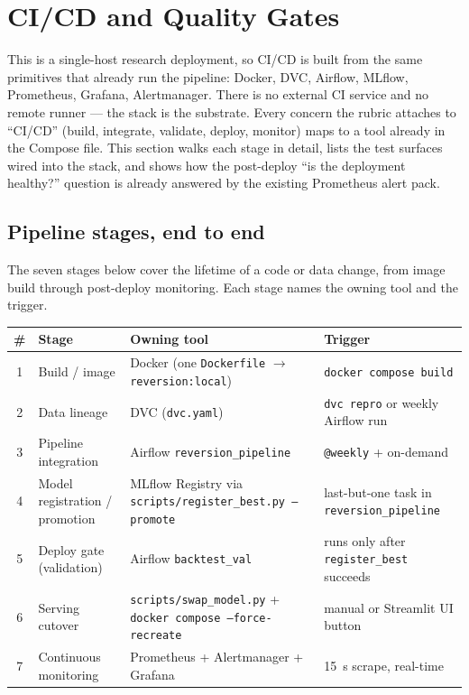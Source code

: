 \documentclass[11pt,a4paper]{article}
\begin{document}
\newpage
\section{CI/CD and Quality Gates}\label{sec:cicd}

This is a single-host research deployment, so CI/CD is built from the same primitives that already run the pipeline: Docker, DVC, Airflow, MLflow, Prometheus, Grafana, Alertmanager. There is no external CI service and no remote runner --- the stack is the substrate. Every concern the rubric attaches to ``CI/CD'' (build, integrate, validate, deploy, monitor) maps to a tool already in the Compose file. This section walks each stage in detail, lists the test surfaces wired into the stack, and shows how the post-deploy ``is the deployment healthy?'' question is already answered by the existing Prometheus alert pack.


\subsection{Pipeline stages, end to end}\label{sec:cicd-stages}

The seven stages below cover the lifetime of a code or data change, from image build through post-deploy monitoring. Each stage names the owning tool and the trigger.

\begin{tabularx}{\linewidth}{@{}clXl@{}}
\toprule
\textbf{\#} & \textbf{Stage} & \textbf{Owning tool} & \textbf{Trigger} \\
\midrule
1 & Build / image                          & Docker (one \texttt{Dockerfile} $\to$ \texttt{reversion:local})              & \texttt{docker compose build} \\
2 & Data lineage                           & DVC (\texttt{dvc.yaml})                                                       & \texttt{dvc repro} or weekly Airflow run \\
3 & Pipeline integration                   & Airflow \texttt{reversion\_pipeline}                                          & \texttt{@weekly} + on-demand \\
4 & Model registration / promotion         & MLflow Registry via \texttt{scripts/register\_best.py --promote}              & last-but-one task in \texttt{reversion\_pipeline} \\
5 & Deploy gate (validation)               & Airflow \texttt{backtest\_val}                                                & runs only after \texttt{register\_best} succeeds \\
6 & Serving cutover                        & \texttt{scripts/swap\_model.py} + \texttt{docker compose --force-recreate}    & manual or Streamlit UI button \\
7 & Continuous monitoring                  & Prometheus + Alertmanager + Grafana                                           & 15~s scrape, real-time \\
\bottomrule
\end{tabularx}
\end{document}
